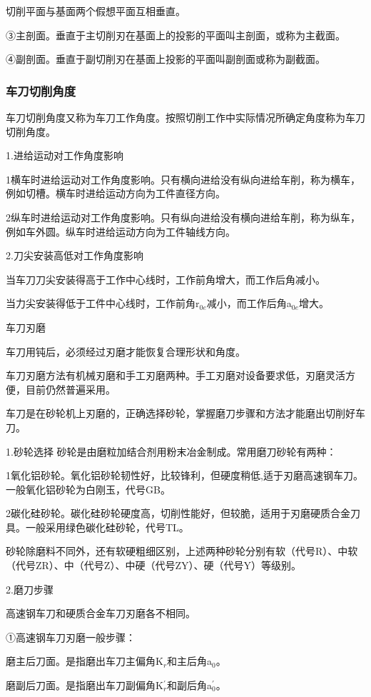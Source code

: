 \documentclass{ctexbook}
\begin{document}
切削平面与基面两个假想平面互相垂直。

③主剖面。垂直于主切削刃在基面上的投影的平面叫主剖面，或称为主截面。

④副剖面。垂直于副切削刃在基面上投影的平面叫副剖面或称为副截面。
\subsubsection{车刀切削角度}
车刀切削角度又称为车刀工作角度。按照切削工作中实际情况所确定角度称为车刀切削角度。

1.进给运动对工作角度影响

1横车时进给运动对工作角度影响。只有横向进给没有纵向进给车削，称为横车，例如切槽。横车时进给运动方向为工件直径方向。

2纵车时进给运动对工作角度影响。只有纵向进给没有横向进给车削，称为纵车，例如车外圆。纵车时进给运动方向为工件轴线方向。

2.刀尖安装高低对工作角度影响

当车刀刀尖安装得高于工作中心线时，工作前角增大，而工作后角减小。

当力尖安装得低于工件中心线时，工作前角r$_{0e}$减小，而工作后角a$_{0e}$增大。

车刀刃磨

车刀用钝后，必须经过刃磨才能恢复合理形状和角度。

车刀刃磨方法有机械刃磨和手工刃磨两种。手工刃磨对设备要求低，刃磨灵活方便，目前仍然普遍采用。

车刀是在砂轮机上刃磨的，正确选择砂轮，掌握磨刀步骤和方法才能磨出切削好车刀。

1.砂轮选择
砂轮是由磨粒加结合剂用粉末冶金制成。常用磨刀砂轮有两种：

1氧化铝砂轮。氧化铝砂轮韧性好，比较锋利，但硬度稍低,适于刃磨高速钢车刀。一般氧化铝砂轮为白刚玉，代号GB。

2碳化硅砂轮。碳化硅砂轮硬度高，切削性能好，但较脆，适用于刃磨硬质合金刀具。一般采用绿色碳化硅砂轮，代号TL。

砂轮除磨料不同外，还有软硬粗细区别，上述两种砂轮分别有软（代号R）、中软（代号ZR）、中（代号Z）、中硬（代号ZY）、硬（代号Y）等级别。

2.磨刀步骤

高速钢车刀和硬质合金车刀刃磨各不相同。

①高速钢车刀刃磨一般步骤：

磨主后刀面。是指磨出车刀主偏角K$_r$和主后角a$_0$。

磨副后刀面。是指磨出车刀副偏角K$^{\prime}_{r}$和副后角a$^{\prime}_{0}$。
\end{document}
